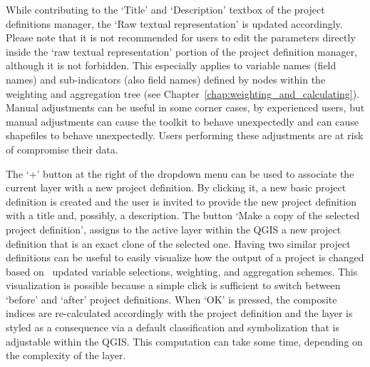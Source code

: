 While contributing to the `Title' and `Description' textbox of the project
definitions manager, the `Raw textual representation' is updated accordingly.
Please note that it is not recommended for users to edit the parameters
directly inside the `raw textual representation' portion of the project
definition manager, although it is not forbidden. This especially applies to
variable names (field names) and sub-indicators (also field names) defined by
nodes within the weighting and aggregation tree (see
Chapter~\ref{chap:weighting_and_calculating}). Manual adjustments can be useful
in some corner cases, by experienced users, but manual adjustments can cause
the toolkit to behave unexpectedly and can cause shapefiles to behave
unexpectedly. Users performing these adjustments are at risk of compromise
their data.

The `+' button at the right of the dropdown menu can be used to associate the
current layer with a new project definition. By clicking it, a new basic
project definition is created and the user is invited to provide the new
project definition with a title and, possibly, a description.  The button `Make
a copy of the selected project definition', assigns to the active layer within
the QGIS a new project definition that is an exact clone of the selected one.
Having two similar project definitions can be useful to easily visualize how
the output of a project is changed based on  updated variable selections,
weighting, and aggregation schemes. This visualization is possible because a
simple click is sufficient to switch between `before' and `after' project
definitions. When `OK' is pressed, the composite indices are re-calculated
accordingly with the project definition and the layer is styled as a
consequence via a default classification and symbolization that is adjustable
within the QGIS\@. This computation can take some time, depending on the
complexity of the layer.
